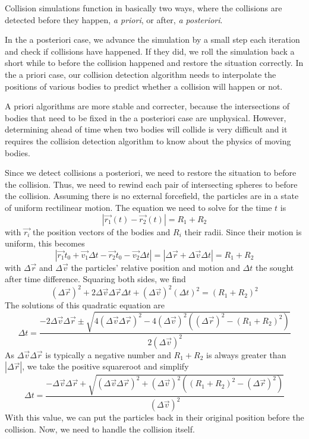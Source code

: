 Collision simulations function in basically two ways, where the collisions are 
detected before they happen, \emph{a priori}, or after, \emph{a posteriori}.  

In the a posteriori case, we advance the simulation by a small step each 
iteration and check if collisions have happened. If they did, we roll the 
simulation back a short while to before the collision happened and restore the 
situation correctly. In the a priori case, our collision detection algorithm 
needs to interpolate the positions of various bodies to predict whether a 
collision will happen or not.

A priori algorithms are more stable and correcter, because the intersections of 
bodies that need to be fixed in the a posteriori case are unphysical. However, 
determining ahead of time when two bodies will collide is very difficult and it 
requires the collision detection algorithm to know about the physics of moving 
bodies.

Since we detect collisions a posteriori, we need to restore the situation to 
before the collision. Thus, we need to rewind each pair of intersecting spheres 
to before the collision. Assuming there is no external forcefield, the 
particles are in a state of uniform rectilinear motion. The equation we need to 
solve for the time $t$ is
$$
|\vec{r_1}(t) - \vec{r_2}(t)| = R_1 + R_2
$$
with $\vec{r_i}$ the position vectors of the bodies and $R_i$ their radii.  
Since their motion is uniform, this becomes
$$
|\vec{r_1}{t_0} + \vec{v_1}\Delta t - \vec{r_2}{t_0} - \vec{v_2}\Delta t| = | 
\Delta\vec{r} + \Delta\vec{v} \Delta t | = R_1 + R_2
$$
with $\Delta\vec{r}$ and $\Delta\vec{v}$ the particles' relative position and 
motion and $\Delta t$ the sought after time difference. Squaring both sides, we 
find
$$
(\Delta\vec{r})^2 + 2\Delta\vec{v}\Delta\vec{r}\Delta t + 
(\Delta\vec{v})^2(\Delta t)^2 = (R_1 + R_2)^2
$$
The solutions of this quadratic equation are
$$
\Delta t = \frac{-2\Delta\vec{v}\Delta\vec{r} \pm 
\sqrt{4(\Delta\vec{v}\Delta\vec{r})^2 - 4(\Delta\vec{v})^2((\Delta\vec{r})^2 - 
(R_1 + R_2)^2)}}{2(\Delta\vec{v})^2}
$$
As $\Delta\vec{v}\Delta\vec{r}$ is typically a negative number and $R_1 + R_2$ 
is always greater than $|\Delta\vec{r}|$, we take the positive squareroot and 
simplify
$$
\Delta t=\frac{-\Delta\vec{v}\Delta\vec{r} + 
\sqrt{(\Delta\vec{v}\Delta\vec{r})^2 + 
(\Delta\vec{v})^2((R_1+R_2)^2-(\Delta\vec{r})^2)}}{(\Delta\vec{v})^2}
$$
With this value, we can put the particles back in their original position 
before the collision. Now, we need to handle the collision itself.

